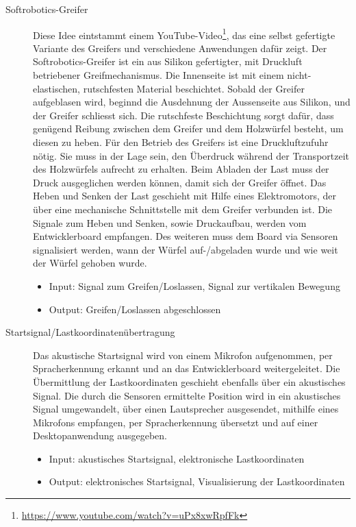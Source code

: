 \documentclass[a4paper,11pt]{scrartcl}
\begin{document}
\begin{description}
    \item[Softrobotics-Greifer] Diese Idee eintstammt einem YouTube-Video\footnote{\url{https://www.youtube.com/watch?v=uPx8xwRpfFk}}, das eine selbst gefertigte Variante des Greifers und verschiedene Anwendungen dafür zeigt. Der Softrobotics-Greifer ist ein aus Silikon gefertigter, mit Druckluft betriebener Greifmechanismus. Die Innenseite ist mit einem nicht-elastischen, rutschfesten Material beschichtet. Sobald der Greifer aufgeblasen wird, beginnd die Ausdehnung der Aussenseite aus Silikon, und der Greifer schliesst sich. Die rutschfeste Beschichtung sorgt dafür, dass genügend Reibung zwischen dem Greifer und dem Holzwürfel besteht, um diesen zu heben. Für den Betrieb des Greifers ist eine Druckluftzufuhr nötig. Sie muss in der Lage sein, den Überdruck während der Transportzeit des Holzwürfels aufrecht zu erhalten. Beim Abladen der Last muss der Druck ausgeglichen werden können, damit sich der Greifer öffnet. Das Heben und Senken der Last geschieht mit Hilfe eines Elektromotors, der über eine mechanische Schnittstelle mit dem Greifer verbunden ist. Die Signale zum Heben und Senken, sowie Druckaufbau, werden vom Entwicklerboard empfangen. Des weiteren muss dem Board via Sensoren signalisiert werden, wann der Würfel auf-/abgeladen wurde und wie weit der Würfel gehoben wurde.
    \begin{itemize}
        \item Input: Signal zum Greifen/Loslassen, Signal zur vertikalen Bewegung
        \item Output: Greifen/Loslassen abgeschlossen
    \end{itemize}
    \item[Startsignal/Lastkoordinatenübertragung] Das akustische Startsignal wird von einem Mikrofon aufgenommen, per Spracherkennung erkannt und an das Entwicklerboard weitergeleitet. Die Übermittlung der Lastkoordinaten geschieht ebenfalls über ein akustisches Signal. Die durch die Sensoren ermittelte Position wird in ein akustisches Signal umgewandelt, über einen Lautsprecher ausgesendet, mithilfe eines Mikrofons empfangen, per Spracherkennung übersetzt und auf einer Desktopanwendung ausgegeben.
    \begin{itemize}
        \item Input: akustisches Startsignal, elektronische Lastkoordinaten
        \item Output: elektronisches Startsignal, Visualisierung der Lastkoordinaten
    \end{itemize}

\end{description}
\end{document}
